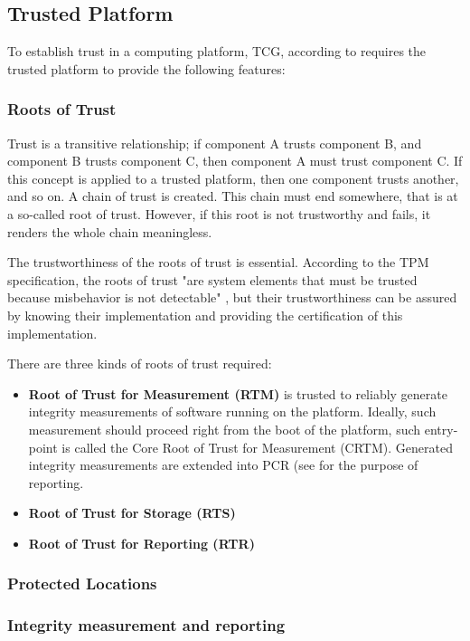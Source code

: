 \subsection{Trusted Platform}
To establish trust in a computing platform, TCG, according to \cite[p.~25]{tcg_p1_architecture} requires the trusted platform to provide the following features:

\subsubsection{Roots of Trust}
Trust is a transitive relationship; if component A trusts component B, and component B trusts component C, then component A must trust component C. If this concept is applied to a trusted platform, then one component trusts another, and so on. A chain of trust is created. This chain must end somewhere, that is at a so-called root of trust. However, if this root is not trustworthy and fails, it renders the whole chain meaningless.

The trustworthiness of the roots of trust is essential. According to the TPM specification, the roots of trust "are system elements that must be trusted because misbehavior is not detectable" \cite[p.~23]{tcg_p1_architecture}, but their trustworthiness can be assured by knowing their implementation and providing the certification of this implementation.

There are three kinds of roots of trust required:
\begin{itemize}
    \item \textbf{Root of Trust for Measurement (RTM)} is trusted to reliably generate integrity measurements of software running on the platform. Ideally, such measurement should proceed right from the boot of the platform, such entry-point is called the Core Root of Trust for Measurement (CRTM). Generated integrity measurements are extended into PCR (see  for the purpose of reporting.
    \item \textbf{Root of Trust for Storage (RTS)}
    \item \textbf{Root of Trust for Reporting (RTR)}
\end{itemize}

\subsubsection{Protected Locations}
\subsubsection{Integrity measurement and reporting}

